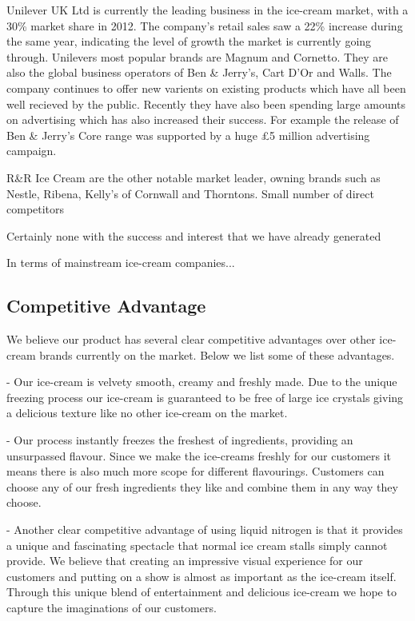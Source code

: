 \documentclass{article}
\begin{document}
  Unilever UK Ltd is currently the leading business in the ice-cream market, with a 30\% market share in 2012. The company's retail sales saw a 22\% increase during the same year, indicating the level of growth the market is currently going through. Unilevers most popular brands are Magnum and Cornetto. They are also the global business operators of Ben \& Jerry's, Cart D'Or and Walls. The company continues to offer new varients on existing products which have all been well recieved by the public. Recently they have also been spending large amounts on advertising which has also increased their success. For example the release of Ben \& Jerry's Core range was supported by a huge £5 million advertising campaign.

  R\&R Ice Cream are the other notable market leader, owning brands such as Nestle, Ribena, Kelly's of Cornwall and Thorntons.  
  Small number of direct competitors

  Certainly none with the success and interest that we have already generated

  In terms of mainstream ice-cream companies...


  \subsection{Competitive Advantage}

We believe our product has several clear competitive advantages over
other ice-cream brands currently on the market. Below we list some of these advantages.

 - Our ice-cream is velvety smooth, creamy and freshly made. Due to
the unique freezing process our ice-cream is guaranteed to be free of
large ice crystals giving a delicious texture like no other ice-cream on the
market.

 - Our process instantly freezes the freshest of ingredients, providing
an unsurpassed flavour. Since we make the ice-creams freshly for
our customers it means there is also much more scope for different
flavourings. Customers can choose any of our fresh ingredients they like and combine them in any way they choose.

 - Another clear competitive advantage of using liquid nitrogen is that
it provides a unique and fascinating spectacle that normal ice cream
stalls simply cannot provide. We believe that creating an impressive
visual experience for our customers and putting on a show is almost
as important as the ice-cream itself. Through this unique blend
of entertainment and delicious ice-cream we hope to capture the
imaginations of our customers.
\end{document}
